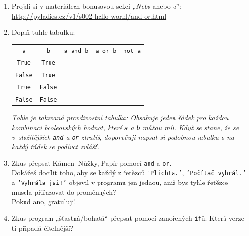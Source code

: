 \documentclass[a4paper,10pt]{article}
\newcommand\True{\texttt{True}}
\newcommand\False{\texttt{False}}
\begin{document}
\begin{enumerate}[resume]

\item Projdi si v materiálech bonusovou sekci „\emph{Nebo} anebo \emph{a}”:
    \\\url{http://pyladies.cz/v1/s002-hello-world/and-or.html}

\item Doplň tuhle tabulku:

    {
        \newcommand\rowend{\rule{0pt}{0.5cm}\\ \hline}
        \begin{tabular}{c|c||c|c|c}
        \arrayrulecolor{silver}
        \verb+a+ & \verb+b+ & \verb+a and b+ & \verb+a or b+ & \verb+not a+ \\
        \arrayrulecolor{black}\hline\arrayrulecolor{silver}
        \True & \True &  &  &  \rowend
        \False & \True &  &  &  \rowend
        \True & \False &  &  &  \rowend
        \False & \False &  &  &  \rowend
        \end{tabular}
    }

    \emph{\small Tohle je takzvaná \emph{pravdivostní tabulka}:
          Obsahuje jeden řádek pro každou kombinaci booleovských hodnot, které \texttt{a} a \texttt{b}
          můžou mít. Když se stane, že se v složitějších \texttt{and} a \texttt{or} ztratíš,
          doporučuji napsat si podobnou tabulku a na každý řádek se podívat zvlášť.}

\item Zkus přepsat Kámen, Nůžky, Papír pomocí \texttt{and} a \texttt{or}.
    \\Dokážeš docílit toho, aby se každý z řetězců \texttt{'Plichta.'},
    \texttt{'Počítač vyhrál.'} a \texttt{'Vyhrála jsi!'} objevil v programu jen jednou,
    aniž bys tyhle řetězce musela přiřazovat do proměnných?
    \\Pokud ano, gratuluji!

\item Zkus program „šťastná/bohatá“ přepsat pomocí zanořených \texttt{if}ů. Která verze ti připadá čitelnější?

\end{enumerate}
\end{document}

